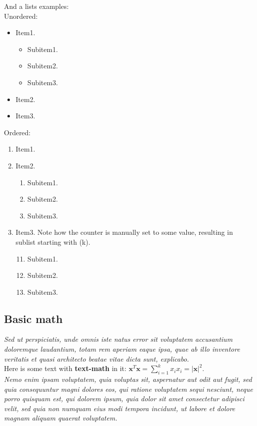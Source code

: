 \documentclass{article}
\begin{document}
And a lists examples:\\
Unordered:
\begin{itemize}
  \item Item1.
  \begin{itemize}
    \item Subitem1.
    \item Subitem2.
    \item Subitem3.
  \end{itemize}
  \item Item2.
  \item Item3.
\end{itemize}
Ordered:
\begin{enumerate}
  \item Item1.
  \item Item2.
  \begin{enumerate}
    \item Subitem1.
    \item Subitem2.
    \item Subitem3.
  \end{enumerate}
  \item Item3. Note how the counter is manually set to some value, resulting in sublist starting with (k).
  \begin{enumerate}
    \setcounter{enumii}{10}
    \item Subitem1.
    \item Subitem2.
    \item Subitem3.
  \end{enumerate}
\end{enumerate}


\subsection{Basic math} \label{sec:basic_math}

\textit{Sed ut perspiciatis, unde omnis iste natus error sit voluptatem accusantium doloremque laudantium, totam rem aperiam eaque ipsa, quae ab illo inventore veritatis et quasi architecto beatae vitae dicta sunt, explicabo.}\\
Here is some text with \textbf{text-math} in it: $\mathbf{x}^{T}\mathbf{x} = \sum_{i=1}^k x_i x_i = |\mathbf{x}|^{2}$.\\
\textit{Nemo enim ipsam voluptatem, quia voluptas sit, aspernatur aut odit aut fugit, sed quia consequuntur magni dolores eos, qui ratione voluptatem sequi nesciunt, neque porro quisquam est, qui dolorem ipsum, quia dolor sit amet consectetur adipisci velit, sed quia non numquam eius modi tempora incidunt, ut labore et dolore magnam aliquam quaerat voluptatem.}\\
\end{document}
